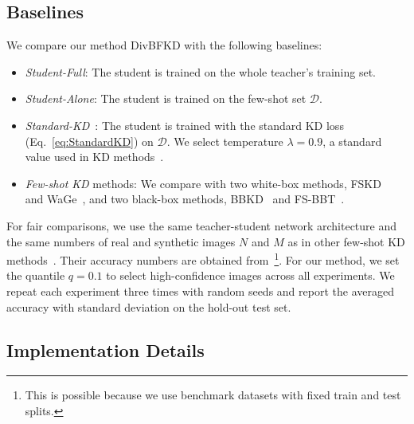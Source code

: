 \documentclass[12pt, a4paper, twoside]{book}
\numberwithin{equation}{chapter}
\theoremstyle{plain}
\theoremstyle{definition}
\theoremstyle{remark}
\newenvironment{foldable}{}{}
\begin{document}
\subsection{Baselines}
\begin{foldable}
  We compare our method DivBFKD with the following baselines:
  \begin{itemize}
    \item \textit{Student-Full}: The student is trained on the whole teacher's training set.
    \item \textit{Student-Alone}: The student is trained on the few-shot set $\mathcal{D}$.
    \item {
        \textit{Standard-KD}~\cite{hinton2015distilling}: The student is trained with the standard \ac{KD} loss (Eq.~\ref{eq:StandardKD}) on $\mathcal{D}$.
        We select temperature $\lambda=0.9$, a standard value used in \ac{KD} methods~\cite{hinton2015distilling,tian2020contrastive,yuan2020revisiting,ma2021undistillable}.
      }
    \item \textit{Few-shot \ac{KD}} methods: We compare with two white-box methods, FSKD~\cite{kimura2018few} and WaGe~\cite{kong2020learning}, and two black-box methods, BBKD~\cite{wang2020neural} and FS-BBT~\cite{nguyen2022black}.
  \end{itemize}
\end{foldable}

\begin{foldable}
  For fair comparisons, we use the same teacher-student network architecture and the same numbers of real and synthetic images $N$ and $M$ as in other few-shot \ac{KD} methods~\cite{kimura2018few,wang2020neural,nguyen2022black}.
  Their accuracy numbers are obtained from~\cite{nguyen2022black}\footnote{This is possible because we use benchmark datasets with fixed train and test splits.}.
  For our method, we set the quantile $q = 0.1$ to select high-confidence images across all experiments.
  We repeat each experiment three times with random seeds and report the averaged accuracy with standard deviation on the hold-out test set.
\end{foldable}

\subsection{Implementation Details}
\end{document}
